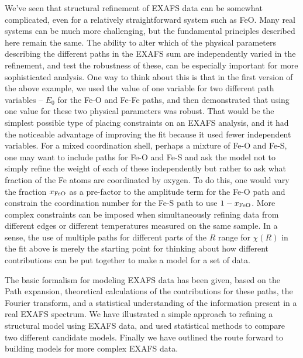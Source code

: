 We've seen that structural refinement of EXAFS data can be somewhat
complicated, even for a relatively straightforward system such as FeO.
Many real systems can be much more challenging, but the fundamental
principles described here remain the same.  The ability to alter which of
the physical parameters describing the different paths in the EXAFS sum are
independently varied in the refinement, and test the robustness of these,
can be especially important for more sophisticated analysis.  One way to
think about this is that in the first version of the above example, we used
the value of one variable for two different path variables -- $E_0$ for the
Fe-O and Fe-Fe paths, and then demonstrated that using one value for these
two physical parameters was robust.  That would be the simplest possible
type of placing constraints on an EXAFS analysis, and it had the noticeable
advantage of improving the fit because it used fewer independent variables.
For a mixed coordination shell, perhaps a mixture of Fe-O and Fe-S, one may
want to include paths for Fe-O and Fe-S and ask the model not to simply
refine the weight of each of these independently but rather to ask what
fraction of the Fe atoms are coordinated by oxygen.  To do this, one would
vary the fraction $x_{\rm FeO}$ as a pre-factor to the amplitude term for
the Fe-O path and constrain the coordination number for the Fe-S path to
use $1 - x_{\rm FeO}$.  More complex constraints can be imposed when
simultaneously refining data from different edges or different temperatures
measured on the same sample.  In a sense, the use of multiple paths for
different parts of the $R$ range for $\chi(R)$ in the fit above is merely
the starting point for thinking about how different contributions can be
put together to make a model for a set of data.

The basic formalism for modeling EXAFS data has been given, based on the
Path expansion, theoretical calculations of the contributions for these
paths, the Fourier transform, and a statistical understanding of the
information present in a real EXAFS spectrum.  We have illustrated a simple
approach to refining a structural model using EXAFS data, and used
statistical methods to compare two different candidate models.  Finally we
have outlined the route forward to building models for more complex EXAFS
data.


